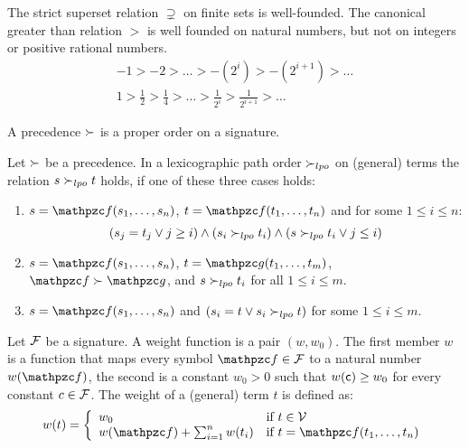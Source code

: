 \begin{example}
	The strict superset relation $\supsetneq$ on finite sets is well-founded.
	The canonical greater than relation $>$ is well founded on natural numbers,
	but not on integers or positive rational numbers.
	\begin{gather*}
	-1 > -2 > \ldots > -(2^i) > -(2^{i+1}) > \ldots\\
	1 > \frac{1}{2} > \frac{1}{4} > \ldots > \frac{1}{2^i} > \frac{1}{2^{i+1}} > \ldots
	\end{gather*}
\end{example}

\begin{definition}\label{def:prec}
	A {\myem precedence} $\succ$ is a proper order 
	on a signature.
\end{definition}

\begin{definition}[LPO]\label{def:lpo}
	Let $\succ$ be a precedence. In a {\myem lexicographic path order} $\succ_{lpo}$ on (general) terms the relation $s\succ_{lpo} t$ holds,
	if one of these three cases holds:
	\begin{enumerate}
		\item $s=\mcf(s_1,\ldots,s_n)$, $t=\mcf(t_1,\ldots,t_n)$ and for some $1\leq i\leq n$:
		\[
		(s_j=t_j\lor j\geq i) \land (s_i\succ_{lpo} t_i) \land (s\succ_{lpo} t_i \lor j\leq i)
		\]
		\item $s=\mcf(s_1,\ldots,s_n)$, $t=\mcg(t_1,\ldots,t_m)$, $\mcf\gtpre\mcg$, and $s\succ_{lpo} t_i$ for all $1\leq i\leq m$.
		\item $s=\mcf(s_1,\ldots,s_n)$ and $(s_i=t \lor s_i\succ_{lpo} t)$ for some $1\leq i\leq m$.
	\end{enumerate}
\end{definition}

\begin{definition}\label{def:weight}
	Let ${\mathcal F}$ be a signature.
	A {\myem weight function} is a pair $(w,w_0)$. 
	The first member $w$ is a function that maps every symbol $\mcf\in\mcF$ to a natural number $w(\mcf)$,
	the second is a constant $w_0>0$ such that $w({\mathsf c})\geq w_0$ for every constant $c\in{\mathcal F}$. 
	The weight of a (general) term $t$ is defined as:
	\begin{gather*}
	w(t) = \left\{ \begin{array}{ll} 
	w_0 & \text{if } t\in\mcV\\
	w(\mcf)+\sum_{i=1}^n w(t_i) & \text{if }t=\mcf(t_1,\ldots,t_n)
	\end{array}\right.
	\end{gather*}
\end{definition}

